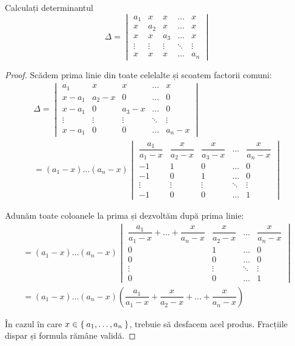 \begin{exercise}[179]
Calculați determinantul
\[
    \Delta = \begin{vmatrix}
    a_1 & x & x & \dots & x \\
    x & a_2 & x & \dots & x \\
    x & x & a_3 & \dots & x \\
    \vdots & \vdots &  \vdots & \ddots & \vdots \\
    x & x & x & \dots & a_n
    \end{vmatrix}
\]
\end{exercise}
\begin{proof}
Scădem prima linie din toate celelalte și scoatem factorii comuni:
\begin{gather*}
    \Delta = \begin{vmatrix}
    a_1 & x & x & \dots & x \\
    x - a_1 & a_2 - x & 0 & \dots & 0 \\
    x - a_1 & 0 & a_3 -x & \dots & 0 \\
    \vdots & \vdots & \vdots & \ddots & \vdots \\
    x - a_1 & 0 & 0 & \dots & a_n - x
    \end{vmatrix} \\
    = (a_1 - x) \dots (a_n - x) \begin{vmatrix}
    \dfrac{a_1}{a_1 - x} & \dfrac{x}{a_2 - x} & \dfrac{x}{a_3 - x} & \dots & \dfrac{x}{a_n - x} \\
    -1 & 1 & 0 & \dots & 0 \\
    -1 & 0 & 1 & \dots & 0 \\
    \vdots & \vdots & \vdots & \ddots & \vdots \\
    -1 & 0 & 0 & \dots & 1
    \end{vmatrix}
\end{gather*}

Adunăm toate coloanele la prima și dezvoltăm după prima linie:
\begin{gather*}
    = (a_1 - x) \dots (a_n - x) \begin{vmatrix}
    \dfrac{a_1}{a_1 - x} + \dots + \dfrac{x}{a_n - x} & \dfrac{x}{a_2 - x} & \dots & \dfrac{x}{a_n - x} \\
    0 & 1 & \dots & 0 \\
    0 & 0 & \dots & 0 \\
    \vdots & \vdots & \ddots & \vdots \\
    0 & 0 & \dots & 1
    \end{vmatrix} \\
    = (a_1 - x) \dots (a_n - x) (\dfrac{a_1}{a_1 - x} + \dfrac{x}{a_2 - x} + \dots + \dfrac{x}{a_n - x})
\end{gather*}

În cazul în care \(x \in \Set{a_1, \dots, a_n}\), trebuie să desfacem acel produs. Fracțiile dispar și formula rămâne validă.
\end{proof}

